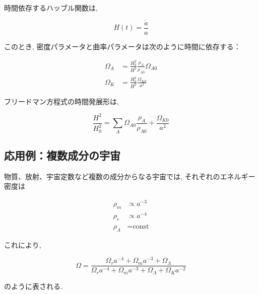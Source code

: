 \documentclass[a4paper,12pt]{article}
\begin{document}
  時間依存するハッブル関数は,
  
  \begin{equation*}
    H(t) = \frac{\dot{a}}{a}
  \end{equation*}
  
  このとき, 密度パラメータと曲率パラメータは次のように時間に依存する：
  
  \begin{align*}
    \Omega_A &= \frac{H_0^2}{H^2} \frac{\rho_A}{\rho_{A0}} \Omega_{A0} \\
    \Omega_K &= \frac{H_0^2}{H^2} \frac{\Omega_{K0}}{a^2}
  \end{align*}
  
  フリードマン方程式の時間発展形は,
  
  \begin{equation*}
    \frac{H^2}{H_0^2} = \sum_A \Omega_{A0} \frac{\rho_A}{\rho_{A0}} + \frac{\Omega_{K0}}{a^2}
  \end{equation*}
  
  \subsection*{応用例：複数成分の宇宙}
  
  物質、放射、宇宙定数など複数の成分からなる宇宙では, それぞれのエネルギー密度は
  
  \begin{align*}
    \rho_m &\propto a^{-3} \\
    \rho_r &\propto a^{-4} \\
    \rho_\Lambda &= \text{const}
  \end{align*}
  
  これにより,
  
  \begin{equation*}
    \Omega = \frac{\Omega_r a^{-4} + \Omega_m a^{-3} + \Omega_\Lambda}{\Omega_r a^{-4} + \Omega_m a^{-3} + \Omega_\Lambda + \Omega_K a^{-2}}
  \end{equation*}
  
  のように表される.
\color{black}
\end{document}
